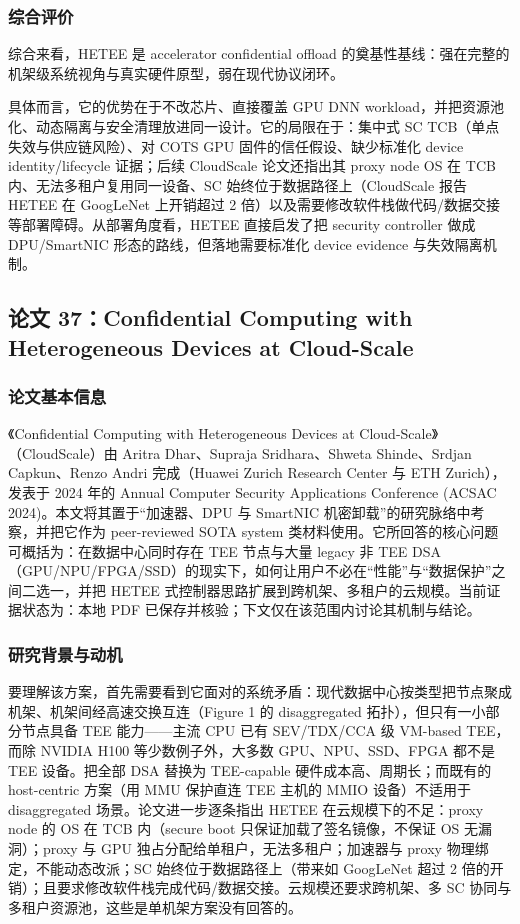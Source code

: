 \documentclass[11pt]{ctexart}
\begin{document}
\subsubsection{综合评价}
综合来看，HETEE 是 accelerator confidential offload 的奠基性基线：强在完整的机架级系统视角与真实硬件原型，弱在现代协议闭环。\par
具体而言，它的优势在于不改芯片、直接覆盖 GPU DNN workload，并把资源池化、动态隔离与安全清理放进同一设计。它的局限在于：集中式 SC TCB（单点失效与供应链风险）、对 COTS GPU 固件的信任假设、缺少标准化 device identity/lifecycle 证据；后续 CloudScale 论文还指出其 proxy node OS 在 TCB 内、无法多租户复用同一设备、SC 始终位于数据路径上（CloudScale 报告 HETEE 在 GoogLeNet 上开销超过 2 倍）以及需要修改软件栈做代码/数据交接等部署障碍\cite{dhar2024cloudscale}。从部署角度看，HETEE 直接启发了把 security controller 做成 DPU/SmartNIC 形态的路线，但落地需要标准化 device evidence 与失效隔离机制。\par

\subsection{论文 37：Confidential Computing with Heterogeneous Devices at Cloud-Scale}
\subsubsection{论文基本信息}
《Confidential Computing with Heterogeneous Devices at Cloud-Scale》（CloudScale）由 Aritra Dhar、Supraja Sridhara、Shweta Shinde、Srdjan Capkun、Renzo Andri 完成（Huawei Zurich Research Center 与 ETH Zurich），发表于 2024 年的 Annual Computer Security Applications Conference (ACSAC 2024)。本文将其置于``加速器、DPU 与 SmartNIC 机密卸载''的研究脉络中考察，并把它作为 peer-reviewed SOTA system 类材料使用。它所回答的核心问题可概括为：在数据中心同时存在 TEE 节点与大量 legacy 非 TEE DSA（GPU/NPU/FPGA/SSD）的现实下，如何让用户不必在``性能''与``数据保护''之间二选一，并把 HETEE 式控制器思路扩展到跨机架、多租户的云规模。当前证据状态为：本地 PDF 已保存并核验；下文仅在该范围内讨论其机制与结论。\cite{dhar2024cloudscale}\par
\subsubsection{研究背景与动机}
要理解该方案，首先需要看到它面对的系统矛盾：现代数据中心按类型把节点聚成机架、机架间经高速交换互连（Figure 1 的 disaggregated 拓扑），但只有一小部分节点具备 TEE 能力——主流 CPU 已有 SEV/TDX/CCA 级 VM-based TEE，而除 NVIDIA H100 等少数例子外，大多数 GPU、NPU、SSD、FPGA 都不是 TEE 设备。把全部 DSA 替换为 TEE-capable 硬件成本高、周期长；而既有的 host-centric 方案（用 MMU 保护直连 TEE 主机的 MMIO 设备）不适用于 disaggregated 场景。论文进一步逐条指出 HETEE 在云规模下的不足：proxy node 的 OS 在 TCB 内（secure boot 只保证加载了签名镜像，不保证 OS 无漏洞）；proxy 与 GPU 独占分配给单租户，无法多租户；加速器与 proxy 物理绑定，不能动态改派；SC 始终位于数据路径上（带来如 GoogLeNet 超过 2 倍的开销）；且要求修改软件栈完成代码/数据交接。云规模还要求跨机架、多 SC 协同与多租户资源池，这些是单机架方案没有回答的。\par
\end{document}
